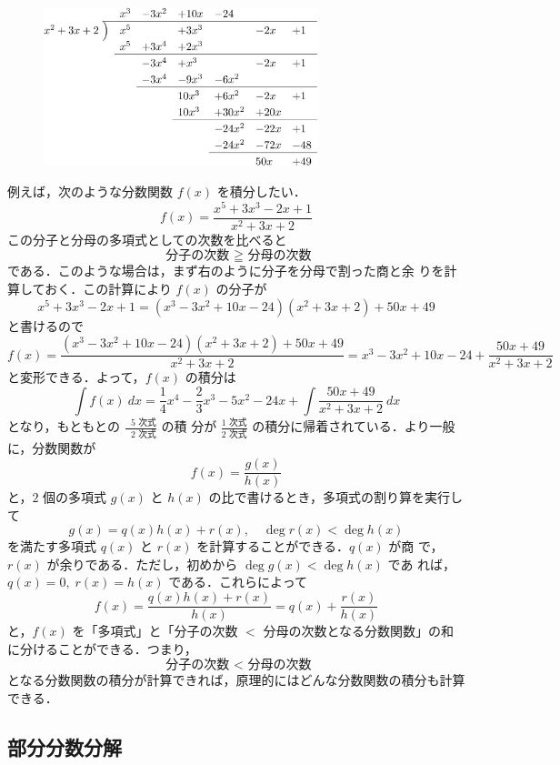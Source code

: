 \documentclass[10pt, uplatex, dvipdfmx]{jsarticle}
\theoremstyle{definition}
\numberwithin{equation}{section}
\newcommand{\ds}{\displaystyle}
\begin{document}
\begin{figure}
  \centering
  \includegraphics[width=8cm]{./pictures/03/remainder.pdf}
\end{figure}
例えば，次のような分数関数 $f(x)$ を積分したい．
\[
  f(x) = \frac{x^5+3x^3-2x+1}{x^2+3x+2}
\]
この分子と分母の多項式としての次数を比べると
\[
  \text{ 分子の次数 }  \geqq \text{ 分母の次数} 
\]
である．このような場合は，まず右のように分子を分母で割った商と余
りを計算しておく．この計算により $f(x)$ の分子が
\[
  x^5+3x^3-2x+1 = (x^3-3x^2+10x-24)(x^2+3x+2) + 50x+49
\]
と書けるので
\[
  f(x) = \frac{ (x^3-3x^2+10x-24)(x^2+3x+2) + 50x+49}{x^2+3x+2} = x^3-3x^2+10x-24 + \frac{50x+49}{x^2+3x+2}
\]
と変形できる．よって，$f(x)$ の積分は
\[
  \int f(x) \ dx = \frac{1}{4}x^4 - \frac{2}{3}x^3-5x^2-24x + \int
  \frac{50x+49}{x^2+3x+2} \ dx
\]
となり，もともとの $\ds \frac{\text{ $5$ 次式}}{\text{ $2$ 次式}}$ の積
分が $\ds \frac{\text{$1$ 次式}}{\text{$2$ 次式}}$ の積分に帰着されている．より一般に，分数関数が
\[
  f(x) = \frac{g(x)}{h(x)}
\]
と，$2$ 個の多項式 $g(x)$ と $h(x)$ の比で書けるとき，多項式の割り算を実行して
\[
  g(x) = q(x) h(x) + r(x), \quad \deg r(x) < \deg h(x)
\]
を満たす多項式 $q(x)$ と $r(x)$ を計算することができる．$q(x)$ が商
で，$r(x)$ が余りである．ただし，初めから $\deg g(x) < \deg h(x)$ であ
れば，$q(x)=0, \; r(x) = h(x)$ である．これらによって
\[
  f(x) = \frac{q(x)h(x)+r(x)}{h(x)} = q(x) + \frac{r(x)}{h(x)}
\]
と，$f(x)$ を「多項式」と「分子の次数 $<$ 分母の次数となる分数関数」の和に分けることができる．つまり，
\[
  \text{ 分子の次数 } < \text{ 分母の次数}
\]
となる分数関数の積分が計算できれば，原理的にはどんな分数関数の積分も計算できる．

\subsection{部分分数分解}\label{subsec:partfrac}
\end{document}
